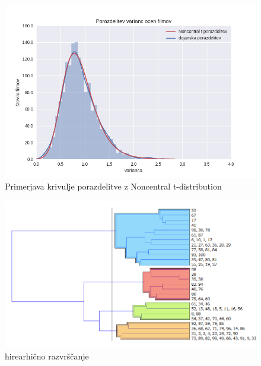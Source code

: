 \documentclass[a4paper,11pt]{article}
\begin{document}
\begin{figure}[htbp]
\begin{center}
\includegraphics[scale=0.7]{porazdelitevStudent.png}
\caption{Primerjava krivulje porazdelitve z Noncentral t-distribution}
\label{slika4}
\end{center}
\end{figure}

\begin{figure}[htbp]
\begin{center}
\includegraphics[scale=0.7]{hirearhicno.png}
\caption{hirearhično razvrščanje}
\label{slika7}
\end{center}
\end{figure}
\end{document}
